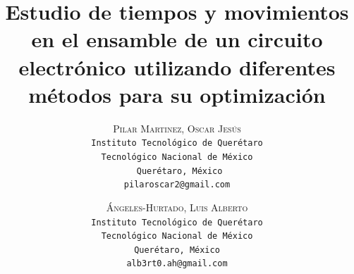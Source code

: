     \lfoot{ \thepage}
    
    \setlength{\droptitle}{-5\baselineskip} %
    \title{\textbf{Estudio de tiempos y movimientos en el ensamble de un circuito electrónico utilizando diferentes métodos para su optimización }} %
    
     \author{ 
     \textsc{Pilar Martinez, Oscar Jesús}\\ 
     \texttt{ Instituto Tecnológico de Querétaro } \\ 
     \texttt{Tecnológico Nacional de México} \\ 
     \texttt{ Querétaro, México}\\ 
     \texttt{pilaroscar2@gmail.com} 
     \and 
     \textsc{Ángeles-Hurtado, Luis Alberto}\\ 
     \texttt{ Instituto Tecnológico de Querétaro } \\ 
     \texttt{ Tecnológico Nacional de México } \\ 
     \texttt{Querétaro, México}\\ 
     \texttt{alb3rt0.ah@gmail.com} 
    }
    
    
    
    
